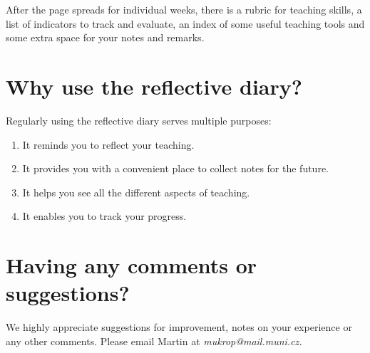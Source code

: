 After the page spreads for individual weeks, there is a rubric for teaching skills, a list of indicators to track and evaluate, an index of some useful teaching tools and some extra space for your notes and remarks.

\section*{Why use the reflective diary?}

Regularly using the reflective diary serves multiple purposes:
\begin{enumerate}[topsep=0pt]
\item It reminds you to reflect your teaching.
\item It provides you with a convenient place to collect notes for the future.
\item It helps you see all the different aspects of teaching.
\item It enables you to track your progress.
\end{enumerate}

\section*{Having any comments or suggestions?}

We highly appreciate suggestions for improvement, notes on your experience or any other comments. Please email Martin at \textit{mukrop@mail.muni.cz.}
